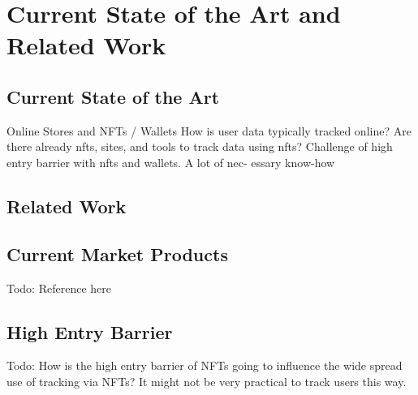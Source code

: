 \chapter{Current State of the Art and Related Work}
\label{ch:SOTA}

%
%
\section{Current State of the Art}
\label{sec:sota:stateOfTheArt}

Online Stores and NFTs / Wallets
How is user data typically tracked online? 
Are there already nfts, sites, and tools to track data using nfts? 
Challenge of high entry barrier with nfts and wallets. A lot of nec- essary know-how 


%
%
\section{Related Work}
\label{sec:sota:relatedWork}


%
%
\section{Current Market Products}
\label{sec:sota:products}

Todo: Reference \cite{walletConnect} here

%
%
\section{High Entry Barrier}
\label{sec:sota:barrier}
Todo: How is the high entry barrier of NFTs going to influence the wide spread use of tracking via NFTs? It might not be very practical to track users this way.